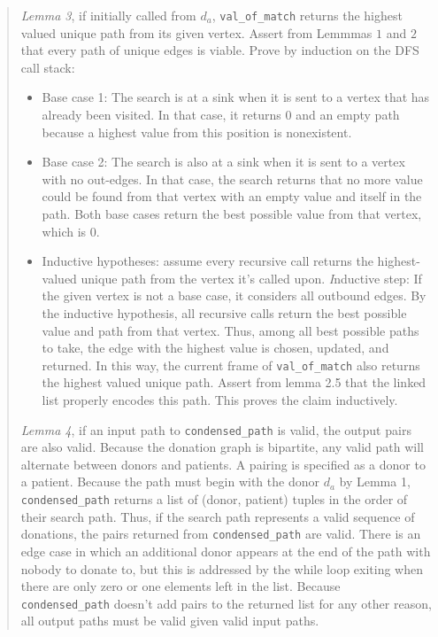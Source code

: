 \documentclass[11pt]{article}
\begin{document}
\begin{enumerate}
\begin{enumerate}
\begin{quote}
      \medskip
      \textit{Lemma 3}, if initially called from $d_a$, \texttt{val\_of\_match} returns the highest valued unique path from its given vertex. Assert from Lemmmas $1$ and $2$ that every path of unique edges is viable. Prove by induction on the DFS call stack: 
      \begin{itemize}
        \item Base case 1: The search is at a sink when it is sent to a vertex that has already been visited. In that case, it returns 0 and an empty path because a highest value from this position is nonexistent.
        \item Base case 2: The search is also at a sink when it is sent to a vertex with no out-edges. In that case, the search returns that no more value could be found from that vertex with an empty value and itself in the path. Both base cases return the best possible value from that vertex, which is 0.
        \item Inductive hypotheses: assume every recursive call returns the highest-valued unique path from the vertex it's called upon. 
        \textit Inductive step: If the given vertex is not a base case, it considers all outbound edges. By the inductive hypothesis, all recursive calls return the best possible value and path from that vertex. Thus, among all best possible paths to take, the edge with the highest value is chosen, updated, and returned. In this way, the current frame of \texttt{val\_of\_match} also returns the highest valued unique path. Assert from lemma 2.5 that the linked list properly encodes this path. This proves the claim inductively.
      \end{itemize}

      \medskip
      \textit{Lemma 4}, if an input path to \texttt{condensed\_path} is valid, the output pairs are also valid. Because the donation graph is bipartite, any valid path will alternate between donors and patients. A pairing is specified as a donor to a patient. Because the path must begin with the donor $d_a$ by Lemma 1, \texttt{condensed\_path} returns a list of (donor, patient) tuples in the order of their search path. Thus, if the search path represents a valid sequence of donations, the pairs returned from \texttt{condensed\_path} are valid. There is an edge case in which an additional donor appears at the end of the path with nobody to donate to, but this is addressed by the while loop exiting when there are only zero or one elements left in the list. Because \texttt{condensed\_path} doesn't add pairs to the returned list for any other reason, all output paths must be valid given valid input paths.  


\end{quote}
\end{enumerate}
\end{enumerate}
\end{document}
